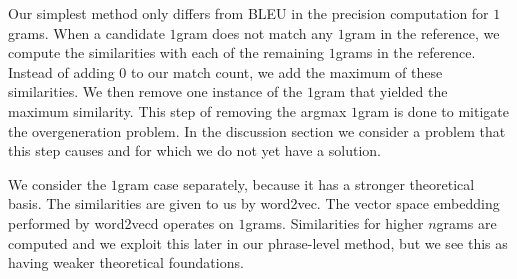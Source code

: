 
Our simplest method only differs from BLEU in the precision computation for $1$grams. 
When a candidate $1$gram does not match any $1$gram in the reference, we compute the similarities with each of the remaining $1$grams in the reference. 
Instead of adding $0$ to our match count, we add the maximum of these similarities. 
We then remove one instance of the $1$gram that yielded the maximum similarity. 
This step of removing the argmax $1$gram is done to mitigate the overgeneration problem. 
In the discussion section we consider a problem that this step causes and for which we do not yet have a solution. 

We consider the $1$gram case separately, because it has a stronger theoretical basis. 
The similarities are given to us by word2vec. 
The vector space embedding performed by word2vecd operates on $1$grams. 
Similarities for higher $n$grams are computed and we exploit this later in our phrase-level method, but we see this as having weaker theoretical foundations. 


